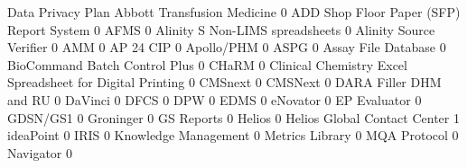 \documentclass{article}
\begin{document}
\begin{Schunk}
\begin{Soutput}
                                                            Data Privacy Plan
  Abbott Transfusion Medicine                                               0
  ADD Shop Floor Paper (SFP) Report System                                  0
  AFMS                                                                      0
  Alinity S Non-LIMS spreadsheets                                           0
  Alinity Source Verifier                                                   0
  AMM                                                                       0
  AP 24 CIP                                                                 0
  Apollo/PHM                                                                0
  ASPG                                                                      0
  Assay File Database                                                       0
  BioCommand Batch Control Plus                                             0
  CHaRM                                                                     0
  Clinical Chemistry Excel Spreadsheet for Digital Printing                 0
  CMSnext                                                                   0
  CMSNext                                                                   0
  DARA Filler DHM and RU                                                    0
  DaVinci                                                                   0
  DFCS                                                                      0
  DPW                                                                       0
  EDMS                                                                      0
  eNovator                                                                  0
  EP Evaluator                                                              0
  GDSN/GS1                                                                  0
  Groninger                                                                 0
  GS Reports                                                                0
  Helios                                                                    0
  Helios Global Contact Center                                              1
  ideaPoint                                                                 0
  IRIS                                                                      0
  Knowledge Management                                                      0
  Metrics Library                                                           0
  MQA Protocol                                                              0
  Navigator                                                                 0

\end{Soutput}
\end{Schunk}
\end{document}
